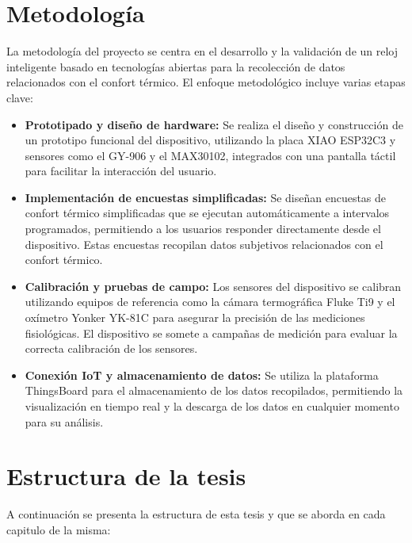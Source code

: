 \documentclass[
  12pt,
  letterpaper,
  DIV=11,
  numbers=noendperiod]{scrreport}
\begin{document}
\hypertarget{metodologuxeda}{%
\section{Metodología}\label{metodologuxeda}}

La metodología del proyecto se centra en el desarrollo y la validación
de un reloj inteligente basado en tecnologías abiertas para la
recolección de datos relacionados con el confort térmico. El enfoque
metodológico incluye varias etapas clave:

\begin{itemize}
\item
  \textbf{Prototipado y diseño de hardware:} Se realiza el diseño y
  construcción de un prototipo funcional del dispositivo, utilizando la
  placa XIAO ESP32C3 y sensores como el GY-906 y el MAX30102, integrados
  con una pantalla táctil para facilitar la interacción del usuario.
\item
  \textbf{Implementación de encuestas simplificadas:} Se diseñan
  encuestas de confort térmico simplificadas que se ejecutan
  automáticamente a intervalos programados, permitiendo a los usuarios
  responder directamente desde el dispositivo. Estas encuestas recopilan
  datos subjetivos relacionados con el confort térmico.
\item
  \textbf{Calibración y pruebas de campo:} Los sensores del dispositivo
  se calibran utilizando equipos de referencia como la cámara
  termográfica Fluke Ti9 y el oxímetro Yonker YK-81C para asegurar la
  precisión de las mediciones fisiológicas. El dispositivo se somete a
  campañas de medición para evaluar la correcta calibración de los
  sensores.
\item
  \textbf{Conexión IoT y almacenamiento de datos:} Se utiliza la
  plataforma ThingsBoard para el almacenamiento de los datos
  recopilados, permitiendo la visualización en tiempo real y la descarga
  de los datos en cualquier momento para su análisis.
\end{itemize}

\hypertarget{estructura-de-la-tesis}{%
\section{Estructura de la tesis}\label{estructura-de-la-tesis}}

A continuación se presenta la estructura de esta tesis y que se aborda
en cada capitulo de la misma:
\end{document}
